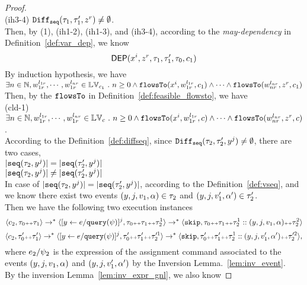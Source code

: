 \begin{proof}
\\
(ih3-4) $\mathtt{Diff}_{\mathtt{seq}}(\mathtt{\tau}_1, \mathtt{\tau}_1', z^r) \neq \emptyset$.
\\
Then, by (1), (ih1-2), (ih1-3), and (ih3-4),  according to the \emph{may-dependency} in Definition~\ref{def:var_dep}, we know
\[
  \mathsf{DEP}(x^i, z^r, \mathtt{\tau}_1, \mathtt{\tau}_1', \mathtt{\tau}_0, c_1)
\]
By induction hypothesis, we have 
\\
$\exists n \in \mathbb{N}, w_{1r}^{l_{1r}}, \cdots, w_{1r}^{l_{nr}} \in \mathbb{LV}_{{c_1}} ~.~ n \geq 0 \land
\mathtt{flowsTo}(x^i,  w_{1r}^{l_{1r}}, c_1) 
\land \cdots \land \mathtt{flowsTo}(w_{nr}^{l_{nr}}, z^r, c_1)$
\\
Then, by the $\mathtt{flowsTo}$ in Definition~\ref{def:feasible_flowsto}, we have 
\\
(cld-1) 
$\exists n \in \mathbb{N}, w_{1r}^{l_{1r}}, \cdots, w_{1r}^{l_{nr}} \in \mathbb{LV}_{{c}} ~.~ n \geq 0 \land
\mathtt{flowsTo}(x^i,  w_{1r}^{l_{1r}}, c) 
\land \cdots \land \mathtt{flowsTo}(w_{nr}^{l_{nr}}, z^r, c)$.
\\
According to the Definition~\ref{def:diffseq}, since $\mathtt{Diff}_{\mathtt{seq}}(\mathtt{\tau}_2, \mathtt{\tau}_2', y^j) \neq \emptyset$, there are
two cases,
\\
$|\mathtt{seq}(\mathtt{\tau}_2, y^j)| = |\mathtt{seq}(\mathtt{\tau}_2', y^j)|$
\\
$|\mathtt{seq}(\mathtt{\tau}_2, y^j)| \neq |\mathtt{seq}(\mathtt{\tau}_2', y^j)|$
\\
In case of $|\mathtt{seq}(\mathtt{\tau}_2, y^j)| = |\mathtt{seq}(\mathtt{\tau}_2', y^j)|$, according to the Definition~\ref{def:vseq},
and  we know 
there exist two events $(y, j, v_1, \alpha) \in \mathtt{\tau}_2$ and $(y, j, v_1', \alpha') \in \mathtt{\tau}_2'$.
\\
Then we have the following two execution instances 
\\
\[
\langle c_2, \mathtt{\tau}_0 {\scriptscriptstyle ++} \mathtt{\tau}_1 \rangle \rightarrow^{*} \langle [\mathrel{ y \leftarrow e / {\tt query}(\psi) }]{}^{j}, \mathtt{\tau}_0 {\scriptscriptstyle ++} \mathtt{\tau}_1 {\scriptscriptstyle ++} \mathtt{\tau}_2^1 \rangle 
\rightarrow^* \langle \mathtt{skip}, \mathtt{\tau}_0 {\scriptscriptstyle ++} \mathtt{\tau}_1 {\scriptscriptstyle ++} \mathtt{\tau}_2^1 ::(y, j, v_1, \alpha) {\scriptscriptstyle ++} \mathtt{\tau}_2^2 \rangle  
\]
%
\[
\langle c_2, \mathtt{\tau}_0' {\scriptscriptstyle ++} \mathtt{\tau}_1' \rangle \rightarrow^{*} \langle [\mathrel{ y \leftarrow e / {\tt query}(\psi) }]{}^{j}, \mathtt{\tau}_0' {\scriptscriptstyle ++} \mathtt{\tau}_1' {\scriptscriptstyle ++} \mathtt{\tau}'^1_2 \rangle 
\rightarrow^* \langle \mathtt{skip}, \mathtt{\tau}_0' {\scriptscriptstyle ++} \mathtt{\tau}_1' {\scriptscriptstyle ++} \mathtt{\tau}_2^1 ::(y, j, v_1', \alpha') {\scriptscriptstyle ++} \mathtt{\tau}'^2_2 \rangle,
\]
where $e_2 / \psi_2$ is the expression of the assignment command associated to the events $(y, j, v_1, \alpha)$ and $(y, j, v_1', \alpha')$ by the Inversion Lemma.~\ref{lem:inv_event}.
\\
By the inversion Lemma~\ref{lem:inv_expr_gnl}, we also know 

\end{proof}
